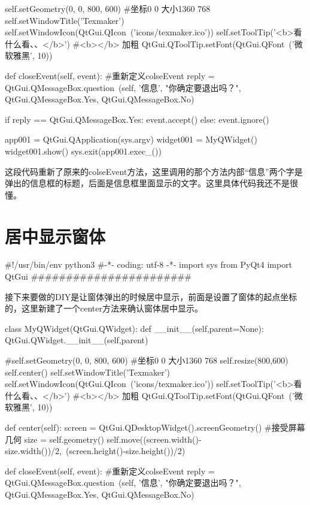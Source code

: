 \documentclass[11pt,oneside]{book}
\begin{document}
\begin{common-format}
\begin{python}
        self.setGeometry(0, 0, 800, 600)
        #坐标0 0 大小1360 768
        self.setWindowTitle('Texmaker')
        self.setWindowIcon(QtGui.QIcon\
        ('icons/texmaker.ico'))
        self.setToolTip('<b>看什么看、、</b>')
        #<b></b> 加粗
        QtGui.QToolTip.setFont(QtGui.QFont\
        ('微软雅黑', 10))
        
    def closeEvent(self, event):
        #重新定义colseEvent
        reply = QtGui.QMessageBox.question\
        (self, '信息',
            "你确定要退出吗？",
             QtGui.QMessageBox.Yes,
             QtGui.QMessageBox.No)

        if reply == QtGui.QMessageBox.Yes:
            event.accept()
        else:
            event.ignore()

app001 = QtGui.QApplication(sys.argv)
widget001 = MyQWidget()
widget001.show()
sys.exit(app001.exec_())
\end{python}
这段代码重新了原来的colseEvent方法，这里调用的那个方法内部“信息”两个字是弹出的信息框的标题，后面是信息框里面显示的文字。这里具体代码我还不是很懂。
\dopython[0]{example004}

\section{居中显示窗体}
\begin{python}
#!/usr/bin/env python3
#-*- coding: utf-8 -*-
import sys
from PyQt4  import QtGui
#######################
\end{python}
接下来要做的DIY是让窗体弹出的时候居中显示，前面是设置了窗体的起点坐标的，这里新建了一个center方法来确认窗体居中显示。
\begin{python}
class MyQWidget(QtGui.QWidget):
    def __init__(self,parent=None):
        QtGui.QWidget.__init__(self,parent)

        #self.setGeometry(0, 0, 800, 600)
        #坐标0 0 大小1360 768
        self.resize(800,600)
        self.center()
        self.setWindowTitle('Texmaker')
        self.setWindowIcon(QtGui.QIcon\
        ('icons/texmaker.ico'))
        self.setToolTip('<b>看什么看、、</b>')
        #<b></b> 加粗
        QtGui.QToolTip.setFont(QtGui.QFont\
        ('微软雅黑', 10))
        
    def center(self):
        screen = QtGui.QDesktopWidget().screenGeometry()
        #接受屏幕几何
        size =  self.geometry()
        self.move((screen.width()-size.width())/2,\
         (screen.height()-size.height())/2)       

    def closeEvent(self, event):
        #重新定义colseEvent
        reply = QtGui.QMessageBox.question\
        (self, '信息',
            "你确定要退出吗？",
             QtGui.QMessageBox.Yes,
             QtGui.QMessageBox.No)


\end{python}
\end{common-format}
\end{document}
